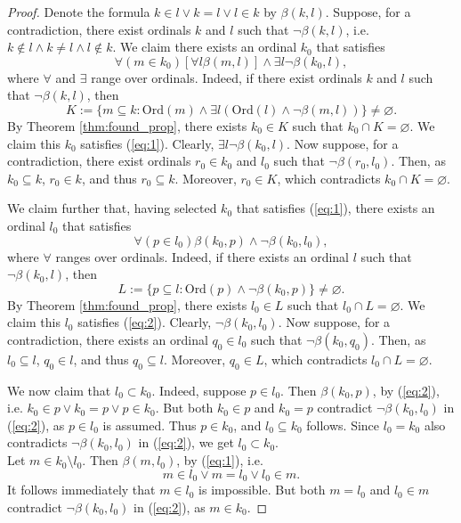 \setcounter{equation}{0}
\begin{proof}
    Denote the formula $k \in l \lor k = l \lor l \in k$ by $\beta (k,l)$. 
    Suppose, for a contradiction, there exist ordinals $k$ and $l$ such that $\neg \beta (k,l)$, i.e. $k \notin l \land k \neq l \land l \notin k$. 
    We claim there exists an ordinal $k_0$ that satisfies
    \begin{equation}\label{eq:1}
    \forall(m \in k_0)[\forall l \beta(m,l)] \land \exists l \neg \beta(k_0,l),
    \end{equation}
    where $\forall$ and $\exists$ range over ordinals. 
    Indeed, if there exist ordinals $k$ and $l$ such that $\neg \beta (k,l)$, then 
    $$K := \{m \subseteq k : \text{Ord}(m) \land \exists l (\text{Ord}(l) \land \neg \beta (m,l))\} \neq \varnothing.$$
    By Theorem \ref{thm:found_prop}, there exists $k_0 \in K$ such that $k_0 \cap K = \varnothing$. 
    We claim this $k_0$ satisfies (\ref{eq:1}). 
    Clearly, $\exists l \neg \beta(k_0,l)$. 
    Now suppose, for a contradiction, there exist ordinals $r_0 \in k_0$ and $l_0$ such that $\neg \beta (r_0,l_0)$. 
    Then, as $k_0 \subseteq k$, $r_0 \in k$, and thus $r_0 \subseteq k$. 
    Moreover, $r_0 \in K$, which contradicts $k_0 \cap K = \varnothing$. 
    
    We claim further that, having selected $k_0$ that satisfies (\ref{eq:1}), there exists an ordinal $l_0$ that satisfies 
    \begin{equation}\label{eq:2}
    \forall(p \in l_0)\beta(k_0,p) \land \neg \beta(k_0,l_0),
    \end{equation}
    where $\forall$ ranges over ordinals. 
    Indeed, if there exists an ordinal $l$ such that $\neg \beta (k_0,l)$, then 
    $$L := \{p \subseteq l : \text{Ord}(p) \land \neg \beta (k_0, p)\} \neq \varnothing.$$
    By Theorem \ref{thm:found_prop}, there exists $l_0 \in L$ such that $l_0 \cap L = \varnothing$. 
    We claim this $l_0$ satisfies (\ref{eq:2}). Clearly, $\neg \beta(k_0,l_0)$. 
    Now suppose, for a contradiction, there exists an ordinal $q_0 \in l_0$ such that $\neg \beta (k_0, q_0)$. 
    Then, as $l_0 \subseteq l$, $q_0 \in l$, and thus $q_0 \subseteq l$. 
    Moreover, $q_0 \in L$, which contradicts $l_0 \cap L = \varnothing$. 
    
    We now claim that $l_0 \subset k_0$. Indeed, suppose $p \in l_0$. 
    Then $\beta (k_0, p)$, by (\ref{eq:2}), i.e. $k_0 \in p \lor k_0 = p \lor p \in k_0$. 
    But both $k_0 \in p$ and $k_0 = p$ contradict $\neg \beta(k_0,l_0)$ in (\ref{eq:2}), as $p \in l_0$ is assumed. 
    Thus $p \in k_0$, and $l_0 \subseteq k_0$ follows. 
    Since $l_0 = k_0$ also contradicts $\neg \beta(k_0,l_0)$ in (\ref{eq:2}), we get $l_0 \subset k_0$. \\
    
    Let $m \in k_0 \setminus l_0$. Then $\beta(m, l_0)$, by (\ref{eq:1}), i.e.
    $$m \in l_0 \lor m = l_0 \lor l_0 \in m.$$
    It follows immediately that $m \in l_0$ is impossible. 
    But both $m=l_0$ and $l_0 \in m$ contradict $\neg \beta(k_0,l_0)$ in (\ref{eq:2}), as $m \in k_0$.
\end{proof}

